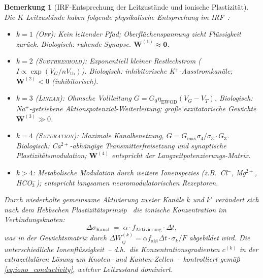 ﻿\documentclass[12pt, a4paper, openany]{report}
\newtheorem{remark}[theorem]{Bemerkung}
\begin{document}
\begin{remark}[IRF-Entsprechung der Leitzustände und ionische Plastizität]
\label{rem:ionic_biology}
Die $K$ Leitzustände haben folgende physikalische Entsprechung im
IRF~\cite{epp2026iono}:
\begin{itemize}
  \item $k=1$ (\textsc{Off}): Kein leitender Pfad; Oberflächenspannung
    zieht Flüssigkeit zurück.  Biologisch: ruhende Synapse.
    $\bm{W}^{(1)} \approx \bm{0}$.
  \item $k=2$ (\textsc{Subthreshold}): Exponentiell kleiner Restleckstrom
    ($I \propto \exp(V_G / n V_\mathrm{th})$).  Biologisch: inhibitorische
    K$^+$-Ausstromkanäle; $\bm{W}^{(2)} < 0$ (inhibitorisch).
  \item $k=3$ (\textsc{Linear}): Ohmsche Vollleitung $G = G_0\eta_{\mathrm{EWOD}}
    (V_G - V_T)$.  Biologisch: Na$^+$-getriebene Aktionspotenzial-Weiterleitung;
    große exzitatorische Gewichte $\bm{W}^{(3)} \gg 0$.
  \item $k=4$ (\textsc{Saturation}): Maximale Kanalbenetzung, $G = G_{\max}
    \sigma_4 / \sigma_3 \cdot G_3$.  Biologisch: Ca$^{2+}$-abhängige
    Transmitterfreisetzung und synaptische Plastizitätsmodulation;
    $\bm{W}^{(4)}$ entspricht der Langzeitpotenzierungs-Matrix.
  \item $k > 4$: Metabolische Modulation durch weitere Ionenspezies
    (z.B.\ Cl$^-$, Mg$^{2+}$, HCO$_3^-$); entspricht langsamen
    neuro\-modulatorischen Rezeptoren.
\end{itemize}
Durch wiederholte gemeinsame Aktivierung zweier Kanäle $k$ und $k'$
verändert sich nach dem Hebbschen Plastizitätsprinzip~\cite{epp2026iono}
die ionische Konzentration im Verbindungsknoten:
\begin{equation}
  \label{eq:ionic_plasticity}
  \Delta\sigma_{\mathrm{Kanal}} \;=\; \alpha \cdot f_{\mathrm{Aktivierung}} \cdot \Delta t,
\end{equation}
was in der Gewichtsmatrix durch
$\Delta W^{(k)}_{ij} = \alpha f_{\mathrm{akt}} \Delta t \cdot \sigma_k / F$
abgebildet wird.
Die unterschiedliche Ionenflüssigkeit~-- d.h.\ die Konzentrationsgradienten
$c^{(k)}$ in der extrazellulären Lösung um Knoten- und Kanten-Zellen~--
kontrolliert gemäß \eqref{eq:iono_conductivity}, welcher Leitzustand dominiert.
\end{remark}
\end{document}
